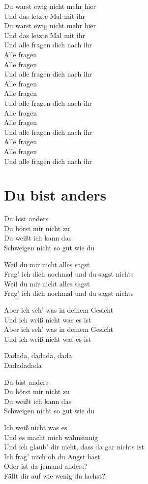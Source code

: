\documentclass[]{book}
\begin{document}
Du warst ewig nicht mehr hier\\
Und das letzte Mal mit ihr\\
Du warst ewig nicht mehr hier\\
Und das letzte Mal mit ihr\\
Und alle fragen dich nach ihr\\
Alle fragen\\
Alle fragen\\
Und alle fragen dich nach ihr\\
Alle fragen\\
Alle fragen\\
Und alle fragen dich nach ihr\\
Alle fragen\\
Alle fragen\\
Und alle fragen dich nach ihr\\
Alle fragen\\
Alle fragen\\
Und alle fragen dich nach ihr

\hypertarget{du-bist-anders}{%
\section{Du bist anders}\label{du-bist-anders}}

Du bist anders\\
Du hörst mir nicht zu\\
Du weißt ich kann das\\
Schweigen nicht so gut wie du

Weil du mir nicht alles sagst\\
Frag' ich dich nochmal und du sagst nichts\\
Weil du mir nicht alles sagst\\
Frag' ich dich nochmal und du sagst nichts

Aber ich seh' was in deinem Gesicht\\
Und ich weiß nicht was es ist\\
Aber ich seh' was in deinem Gesicht\\
Und ich weiß nicht was es ist

Dadada, dadada, dada\\
Dadadadada

Du bist anders\\
Du hörst mir nicht zu\\
Du weißt ich kann das\\
Schweigen nicht so gut wie du

Ich weiß nicht was es\\
Und es macht mich wahnsinnig\\
Und ich glaub' dir nicht, dass da gar nichts ist\\
Ich frag' mich ob du Angst hast\\
Oder ist da jemand anders?\\
Fällt dir auf wie wenig du lachst?
\end{document}
